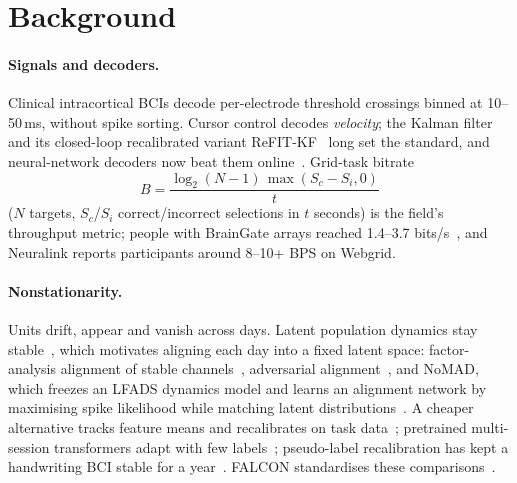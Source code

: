 \documentclass[10pt,twocolumn]{article}
\begin{document}
\section{Background}
\paragraph{Signals and decoders.} Clinical intracortical BCIs decode per-electrode
threshold crossings binned at 10--50\,ms, without spike sorting. Cursor control decodes
\emph{velocity}; the Kalman filter~\cite{wu2006kalman} and its closed-loop recalibrated
variant ReFIT-KF~\cite{gilja2012refit} long set the standard, and neural-network decoders
now beat them online~\cite{willsey2022realtime}. Grid-task bitrate~\cite{nuyujukian2015keyboard}
\begin{equation}
  B = \frac{\log_2(N-1)\,\max(S_c - S_i, 0)}{t}
  \label{eq:bps}
\end{equation}
($N$ targets, $S_c$/$S_i$ correct/incorrect selections in $t$ seconds) is the field's
throughput metric; people with BrainGate arrays reached 1.4--3.7 bits/s~\cite{pandarinath2017high},
and Neuralink reports participants around 8--10+ BPS on Webgrid.

\paragraph{Nonstationarity.} Units drift, appear and vanish across days. Latent population
dynamics stay stable~\cite{gallego2020long}, which motivates aligning each day into a fixed
latent space: factor-analysis alignment of stable channels~\cite{degenhart2020stabilization},
adversarial alignment~\cite{farshchian2019adversarial}, and NoMAD, which freezes an LFADS
dynamics model and learns an alignment network by maximising spike likelihood while
matching latent distributions~\cite{karpowicz2025nomad,pandarinath2018lfads}. A cheaper
alternative tracks feature means and recalibrates on task data~\cite{jarosiewicz2015virtual};
pretrained multi-session transformers adapt with few labels~\cite{ye2023ndt2,azabou2023poyo,ye2025ndt3};
pseudo-label recalibration has kept a handwriting BCI stable for a year~\cite{fan2023plug}.
FALCON standardises these comparisons~\cite{karpowicz2024falcon}.
\end{document}
